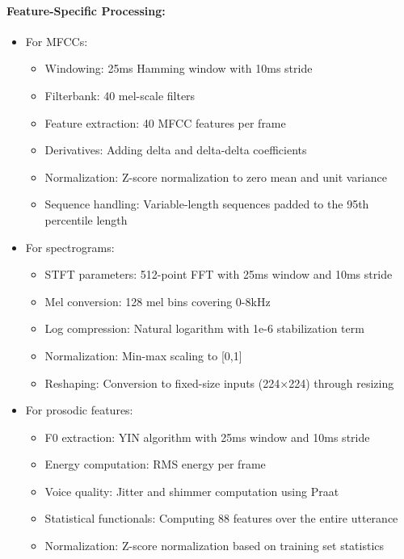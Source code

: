 \documentclass[12pt]{article}
\begin{document}
\paragraph{Feature-Specific Processing:}
\begin{itemize}
    \item For MFCCs:
    \begin{itemize}
        \item Windowing: 25ms Hamming window with 10ms stride
        \item Filterbank: 40 mel-scale filters
        \item Feature extraction: 40 MFCC features per frame
        \item Derivatives: Adding delta and delta-delta coefficients
        \item Normalization: Z-score normalization to zero mean and unit variance
        \item Sequence handling: Variable-length sequences padded to the 95th percentile length
    \end{itemize}
    
    \item For spectrograms:
    \begin{itemize}
        \item STFT parameters: 512-point FFT with 25ms window and 10ms stride
        \item Mel conversion: 128 mel bins covering 0-8kHz
        \item Log compression: Natural logarithm with 1e-6 stabilization term
        \item Normalization: Min-max scaling to [0,1]
        \item Reshaping: Conversion to fixed-size inputs (224×224) through resizing
    \end{itemize}
    
    \item For prosodic features:
    \begin{itemize}
        \item F0 extraction: YIN algorithm with 25ms window and 10ms stride
        \item Energy computation: RMS energy per frame
        \item Voice quality: Jitter and shimmer computation using Praat
        \item Statistical functionals: Computing 88 features over the entire utterance
        \item Normalization: Z-score normalization based on training set statistics
    \end{itemize}
    

\end{itemize}
\end{document}
